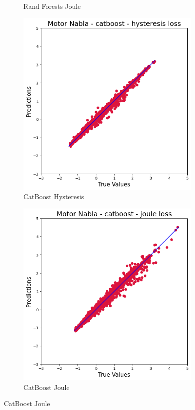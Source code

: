 \documentclass{article}
\begin{document}
\begin{figure}[!htbp]
\begin{subfigure}[b]{0.23\textwidth}
        \caption{Rand Forests Joule}
    \end{subfigure}
    \hfill
    \begin{subfigure}[b]{0.23\textwidth}
        \centering
        \includegraphics[width=\textwidth]{images/Nabla/catboost_hysteresis.png}
        \caption{CatBoost Hysteresis}
    \end{subfigure}
    \hfill
    \begin{subfigure}[b]{0.23\textwidth}
        \centering
        \includegraphics[width=\textwidth]{images/Nabla/catboost_joule.png}
        \caption{CatBoost Joule}
    \end{subfigure}
    

\end{figure}
\end{document}
